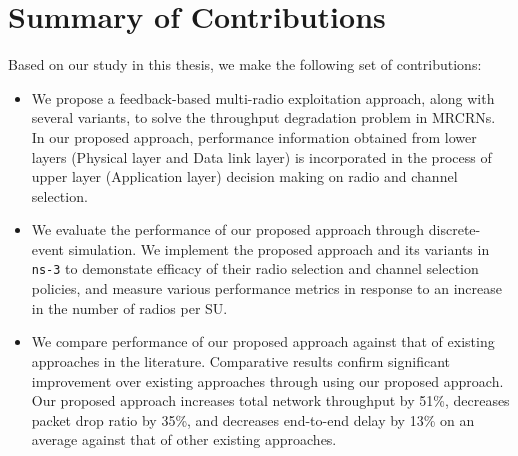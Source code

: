
\section{Summary of Contributions}

Based on our study in this thesis, we make the following set of contributions:

\begin{itemize}
\item We propose a feedback-based multi-radio exploitation approach, along with several variants, to solve the throughput degradation problem in MRCRNs. In our proposed approach, performance information obtained from lower layers (Physical layer and Data link layer) is incorporated in the process of upper layer (Application layer) decision making on radio and channel selection.
\item We evaluate the performance of our proposed approach through discrete-event simulation. We implement the proposed approach and its variants in \texttt{ns-3} to demonstate efficacy of their radio selection and channel selection policies, and measure various performance metrics in response to an increase in the number of radios per SU.
\item We compare performance of our proposed approach against that of existing approaches in the literature. Comparative results confirm significant improvement over existing approaches through using our proposed approach. Our proposed approach increases total network throughput by 51\%, decreases packet drop ratio by 35\%, and decreases end-to-end delay by 13\% on an average against that of other existing approaches.
\end{itemize}
\endinput
